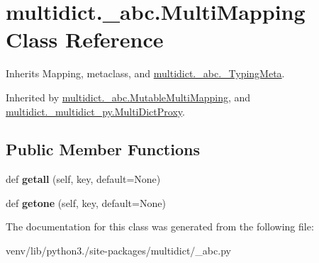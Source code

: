 \hypertarget{classmultidict_1_1__abc_1_1_multi_mapping}{}\section{multidict.\+\_\+abc.\+Multi\+Mapping Class Reference}
\label{classmultidict_1_1__abc_1_1_multi_mapping}


Inherits Mapping, metaclass, and \hyperlink{classmultidict_1_1__abc_1_1___typing_meta}{multidict.\+\_\+abc.\+\_\+\+Typing\+Meta}.



Inherited by \hyperlink{classmultidict_1_1__abc_1_1_mutable_multi_mapping}{multidict.\+\_\+abc.\+Mutable\+Multi\+Mapping}, and \hyperlink{classmultidict_1_1__multidict__py_1_1_multi_dict_proxy}{multidict.\+\_\+multidict\+\_\+py.\+Multi\+Dict\+Proxy}.

\subsection*{Public Member Functions}
\begin{DoxyCompactItemize}
\item 
\mbox{\label{classmultidict_1_1__abc_1_1_multi_mapping_a7ee0e84545dff895d3746af240e8fa06}} 
def {\bfseries getall} (self, key, default=None)
\item 
\mbox{\label{classmultidict_1_1__abc_1_1_multi_mapping_afdee3b60e37dd59daa8a9c70ea232b70}} 
def {\bfseries getone} (self, key, default=None)
\end{DoxyCompactItemize}


The documentation for this class was generated from the following file\+:\begin{DoxyCompactItemize}
\item 
venv/lib/python3./site-\/packages/multidict/\+\_\+abc.\+py\end{DoxyCompactItemize}
